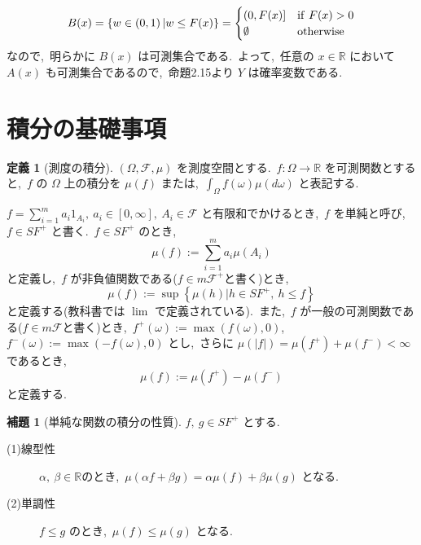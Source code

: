\documentclass[a4j,11pt]{jarticle}
\theoremstyle{definition}
\newtheorem{definition}[theorem]{定義}
\newtheorem{lemma}[theorem]{補題}
\begin{document}
\begin{equation}
  B(x) = \left\{ w  \in\left( 0,1\right) | w \leq F(x)\right\} = 
  \begin{cases}
    \left( 0, F(x)\right] & {\rm if } \ F(x) > 0 \\
    \emptyset & {\rm otherwise}
  \end{cases}
\end{equation}
なので,\ 明らかに
$B(x)$
は可測集合である.\ 
よって,\ 任意の
$x\in \mathbb{R}$
において
$A(x)$
も可測集合であるので,\ 命題2.15より
$Y$
は確率変数である.\ 

\section*{積分の基礎事項}
\begin{definition}[測度の積分]
  $(\Omega,\mathcal{F},\mu)$
  を測度空間とする.\ 
  $f:\Omega \to \mathbb{R}$
  を可測関数とすると,\ 
  $f$
  の
  $\Omega$
  上の積分を
  $\mu (f)$
  または,\ 
  $\int_{\Omega} f(\omega) \mu (d\omega)$
  と表記する.\ 

  $f = \sum_{i=1}^m a_i 1_{A_i},\ a_i \in \left[ 0, \infty\right],\ A_i \in \mathcal{F}$
  と有限和でかけるとき,\ 
  $f$
  を単純と呼び,\ 
  $f \in SF^+$
  と書く.\ 
  $f \in SF^+$
  のとき,\ 
  \begin{equation}
    \mu (f) := \sum_{i=1}^m a_i \mu(A_i)
  \end{equation}
  と定義し,\ 
  $f$
  が非負値関数である($f \in m\mathcal{F}^+$と書く)とき,\ 
  \begin{equation}
    \mu(f) := \sup\left\{ \mu(h) | h \in SF^+,\ h \leq f\right\}
  \end{equation}
  と定義する(教科書では
  $\lim$
  で定義されている).\ 
  また,\ 
  $f$
  が一般の可測関数である($f \in m\mathcal{F}$と書く)とき,\ 
  $f^+(\omega) := \max(f(\omega),0)$,\ 
  $f^-(\omega) := \max(-f(\omega),0)$
  とし,\ さらに
  $\mu(|f|)=\mu(f^+)+\mu(f^-) < \infty$
  であるとき,\ 
  \begin{equation}
    \mu(f) := \mu(f^+) - \mu(f^-)
  \end{equation}
  と定義する.\ 
\end{definition}

\begin{lemma}[単純な関数の積分の性質]\label{lemma:int_nature}
  $f,\ g \in SF^+$
  とする.\ 
  \begin{description}
    \item[(1)線型性]
      $\alpha,\ \beta \in \mathbb{R}$のとき,\ 
      $\mu(\alpha f + \beta g) = \alpha \mu(f) + \beta \mu(g)$
      となる.\ 
    \item[(2)単調性]
      $f \leq g$
      のとき,\ 
      $\mu(f) \leq \mu(g)$
      となる.\ 
  \end{description}
\end{lemma}
\end{document}
